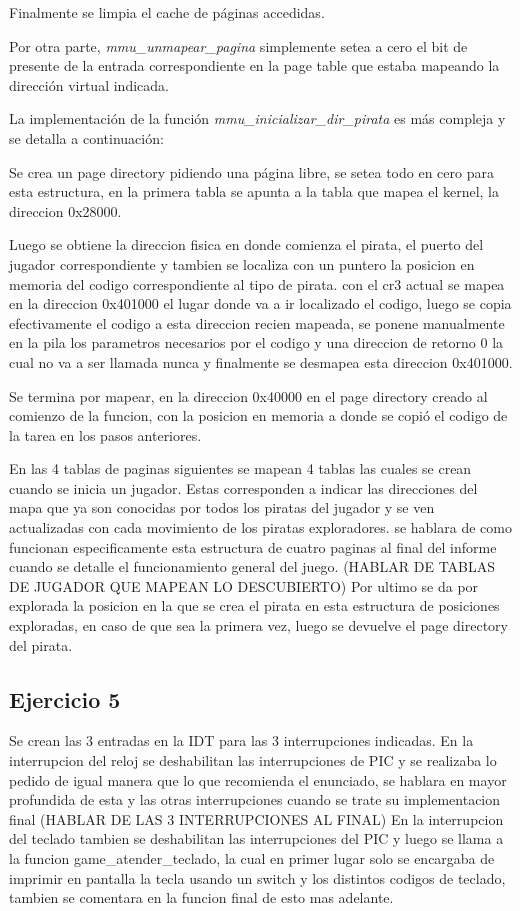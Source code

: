 Finalmente se limpia el cache de páginas accedidas.

Por otra parte, {\it mmu_unmapear_pagina\/} simplemente setea a cero el bit de
presente de la entrada correspondiente en la page table que estaba mapeando la
dirección virtual indicada.

La implementación de la función {\it mmu_inicializar_dir_pirata\/} es más
compleja y se detalla a continuación:

Se crea un page directory pidiendo una página libre, se setea todo en cero para esta estructura,
en la primera tabla se apunta a la tabla que mapea el kernel, la direccion 0x28000.

Luego se obtiene la direccion fisica en donde comienza el pirata, el puerto del jugador correspondiente y
tambien se localiza con un puntero la posicion en memoria del codigo correspondiente al tipo de pirata.
con el cr3 actual se mapea en la direccion 0x401000 el lugar donde va a ir localizado el codigo,
luego se copia efectivamente el codigo a esta direccion recien mapeada, se ponene manualmente en la pila
los parametros necesarios por el codigo y una direccion de retorno 0 la cual no va a ser llamada nunca y
finalmente se desmapea esta direccion 0x401000.

Se termina por mapear, en la direccion 0x40000 en el page directory creado al comienzo de la funcion, con
la posicion en memoria a donde se copió el codigo de la tarea en los pasos anteriores.

En las 4 tablas de paginas siguientes se mapean 4 tablas las cuales se crean cuando se inicia un jugador.
Estas corresponden a indicar las direcciones del mapa que ya son conocidas por todos los piratas del jugador
y se ven actualizadas con cada movimiento de los piratas exploradores. se hablara de como funcionan especificamente
esta estructura de cuatro paginas al final del informe cuando se detalle el funcionamiento general del juego.   (HABLAR DE TABLAS DE JUGADOR QUE MAPEAN LO DESCUBIERTO)
Por ultimo se da por explorada la posicion en la que se crea el pirata en esta estructura de posiciones exploradas,
en caso de que sea la primera vez, luego se devuelve el page directory del pirata.


\subsection{Ejercicio 5}

Se crean las 3 entradas en la IDT para las 3 interrupciones indicadas.
En la interrupcion del reloj se deshabilitan las interrupciones de PIC
y se realizaba lo pedido de igual manera que lo que recomienda el enunciado, se hablara
en mayor profundida de esta y las otras interrupciones cuando se trate su implementacion final                            (HABLAR DE LAS 3 INTERRUPCIONES AL FINAL)
En la interrupcion del teclado tambien se deshabilitan las interrupciones del PIC y luego se llama a
la funcion game_atender_teclado, la cual en primer lugar solo se encargaba de imprimir en pantalla la tecla
usando un switch y los distintos codigos de teclado, tambien se comentara en la funcion final de esto mas adelante.

